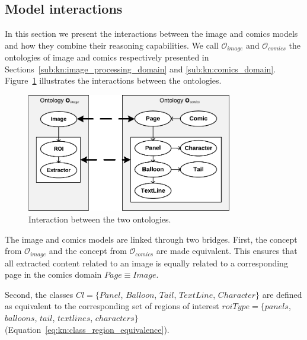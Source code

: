 
\subsection{Model interactions} %
\label{sub:model_interactions}

In this section we present the interactions between the image and comics models and how they combine their reasoning capabilities.
We call $\mathcal{O}_{image}$ and $\mathcal{O}_{comics}$ the ontologies of image and comics respectively presented in Sections~\ref{sub:kn:image_processing_domain} and \ref{sub:kn:comics_domain}.
Figure~\ref{fig:kn:interactions} illustrates the interactions between the ontologies.

\begin{figure}[h!]
\begin{center}
\includegraphics[width=0.8\textwidth]{interactions.pdf}
\caption{Interaction between the two ontologies.}
\label{fig:kn:interactions}
\end{center}
\end{figure}

The image and comics models are linked through two bridges.
First, the  concept from $\mathcal{O}_{image}$ and the  concept from $\mathcal{O}_{comics}$ are made equivalent.
This ensures that all extracted content related to an image is equally related to a corresponding page in the comics domain $Page \equiv  Image$.

Second, the classes $Cl=\{Panel$, $Balloon$, $Tail$, $TextLine$, $Character\}$ are defined as equivalent to the corresponding set of regions of interest $roiType = \{panels$, $balloons$, $tail$, $text lines$, $characters\}$ (Equation~\ref{eq:kn:class_region_equivalence}).%
  

